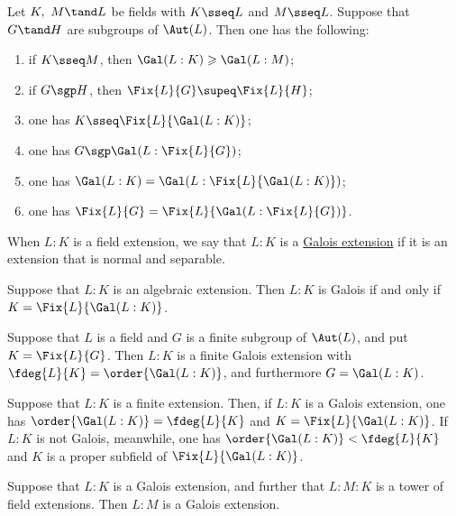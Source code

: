 \documentclass{article}
\begin{document}
  \begin{tproposition}
    Let \( K,\ M \tand L \) be fields with \( K\sseq L \) and \( M\sseq L \).
    Suppose that \( G\tand H \) are subgroups of \( \Aut(L) \).
    Then one has the following: \begin{enumerate}[label=(\alph*)]
      \item if \( K\sseq M \), then \( \Gal(L:K) \geqslant \Gal(L:M) \);
      \item if \( G\sgp H \), then \( \Fix{L}{G}\supeq \Fix{L}{H} \);
      \item one has \( K\sseq \Fix{L}{\Gal(L:K)} \);
      \item one has \( G\sgp\Gal(L:\Fix{L}{G}) \);
      \item one has \( \Gal(L:K) = \Gal(L:\Fix{L}{\Gal(L:K)}) \);
      \item one has \( \Fix{L}{G} = \Fix{L}{\Gal(L:\Fix{L}{G})} \).
    \end{enumerate}
  \end{tproposition}

  \begin{tdefinition}
    When \( L:K \) is a field extension, we say that \( L:K \) is a \ul{Galois extension} if it is an extension that is normal and separable.
  \end{tdefinition}

  \begin{ttheorem}
    Suppose that \( L:K \) is an algebraic extension.
    Then \( L:K \) is Galois if and only if \( K=\Fix{L}{\Gal(L:K)} \).
  \end{ttheorem}

  \begin{ttheorem}
    Suppose that \( L \) is a field and \( G \) is a finite subgroup of \( \Aut(L) \), and put \( K=\Fix{L}{G} \).
    Then \( L:K \) is a finite Galois extension with \( \fdeg{L}{K}=\order{\Gal(L:K)} \), and furthermore \( G=\Gal(L:K) \).
  \end{ttheorem}

  \begin{ttheorem}
    Suppose that \( L:K \) is a finite extension.
    Then, if \( L:K \) is a Galois extension, one has \( \order{\Gal(L:K)}=\fdeg{L}{K} \) and \( K=\Fix{L}{\Gal(L:K)}\).
    If \( L:K \) is not Galois, meanwhile, one has \( \order{\Gal(L:K)}<\fdeg{L}{K} \) and \( K \) is a proper subfield of \( \Fix{L}{\Gal(L:K)}\).
  \end{ttheorem}

  \begin{tproposition}
    Suppose that \( L:K \) is a Galois extension, and further that \( L:M:K \) is a tower of field extensions.
    Then \( L:M \) is a Galois extension.
  \end{tproposition}
\end{document}
